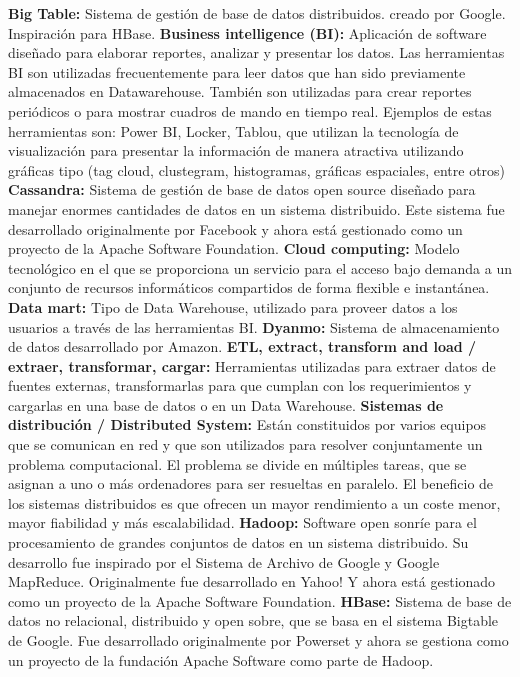 \documentclass[
  letterpaper,
  DIV=11,
  numbers=noendperiod]{scrreprt}
\begin{document}
\textbf{Big Table:} Sistema de gestión de base de datos distribuidos.
creado por Google. Inspiración para HBase. \textbf{Business intelligence
(BI):} Aplicación de software diseñado para elaborar reportes, analizar
y presentar los datos. Las herramientas BI son utilizadas frecuentemente
para leer datos que han sido previamente almacenados en Datawarehouse.
También son utilizadas para crear reportes periódicos o para mostrar
cuadros de mando en tiempo real. Ejemplos de estas herramientas son:
Power BI, Locker, Tablou, que utilizan la tecnología de visualización
para presentar la información de manera atractiva utilizando gráficas
tipo (tag cloud, clustegram, histogramas, gráficas espaciales, entre
otros) \textbf{Cassandra:} Sistema de gestión de base de datos open
source diseñado para manejar enormes cantidades de datos en un sistema
distribuido. Este sistema fue desarrollado originalmente por Facebook y
ahora está gestionado como un proyecto de la Apache Software Foundation.
\textbf{Cloud computing:} Modelo tecnológico en el que se proporciona un
servicio para el acceso bajo demanda a un conjunto de recursos
informáticos compartidos de forma flexible e instantánea. \textbf{Data
mart:} Tipo de Data Warehouse, utilizado para proveer datos a los
usuarios a través de las herramientas BI. \textbf{Dyanmo:} Sistema de
almacenamiento de datos desarrollado por Amazon. \textbf{ETL, extract,
transform and load / extraer, transformar, cargar:} Herramientas
utilizadas para extraer datos de fuentes externas, transformarlas para
que cumplan con los requerimientos y cargarlas en una base de datos o en
un Data Warehouse. \textbf{Sistemas de distribución / Distributed
System:} Están constituidos por varios equipos que se comunican en red y
que son utilizados para resolver conjuntamente un problema
computacional. El problema se divide en múltiples tareas, que se asignan
a uno o más ordenadores para ser resueltas en paralelo. El beneficio de
los sistemas distribuidos es que ofrecen un mayor rendimiento a un coste
menor, mayor fiabilidad y más escalabilidad. \textbf{Hadoop:} Software
open sonríe para el procesamiento de grandes conjuntos de datos en un
sistema distribuido. Su desarrollo fue inspirado por el Sistema de
Archivo de Google y Google MapReduce. Originalmente fue desarrollado en
Yahoo! Y ahora está gestionado como un proyecto de la Apache Software
Foundation. \textbf{HBase:} Sistema de base de datos no relacional,
distribuido y open sobre, que se basa en el sistema Bigtable de Google.
Fue desarrollado originalmente por Powerset y ahora se gestiona como un
proyecto de la fundación Apache Software como parte de Hadoop.
\end{document}

